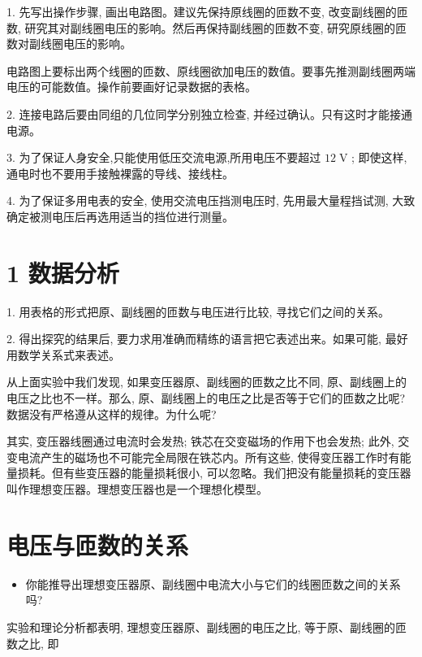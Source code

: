 \documentclass[10pt]{article}
\begin{document}
1. 先写出操作步骤, 画出电路图。建议先保持原线圈的匝数不变, 改变副线圈的匝数, 研究其对副线圈电压的影响。然后再保持副线圈的匝数不变, 研究原线圈的匝数对副线圈电压的影响。

电路图上要标出两个线圈的匝数、原线圈欲加电压的数值。要事先推测副线圈两端电压的可能数值。操作前要画好记录数据的表格。

2. 连接电路后要由同组的几位同学分别独立检查, 并经过确认。只有这时才能接通电源。

3. 为了保证人身安全,只能使用低压交流电源,所用电压不要超过 \({12}\mathrm{\;V}\) ; 即使这样, 通电时也不要用手接触裸露的导线、接线柱。

4. 为了保证多用电表的安全, 使用交流电压挡测电压时, 先用最大量程挡试测, 大致确定被测电压后再选用适当的挡位进行测量。

\section*{1 数据分析}

1. 用表格的形式把原、副线圈的匝数与电压进行比较, 寻找它们之间的关系。

2. 得出探究的结果后, 要力求用准确而精练的语言把它表述出来。如果可能, 最好用数学关系式来表述。

从上面实验中我们发现, 如果变压器原、副线圈的匝数之比不同, 原、副线圈上的电压之比也不一样。那么, 原、副线圈上的电压之比是否等于它们的匝数之比呢? 数据没有严格遵从这样的规律。为什么呢?

其实, 变压器线圈通过电流时会发热; 铁芯在交变磁场的作用下也会发热; 此外, 交变电流产生的磁场也不可能完全局限在铁芯内。所有这些, 使得变压器工作时有能量损耗。但有些变压器的能量损耗很小, 可以忽略。我们把没有能量损耗的变压器叫作理想变压器。理想变压器也是一个理想化模型。

\section*{电压与匝数的关系}

\begin{mdframed}

\begin{itemize}
\item 你能推导出理想变压器原、副线圈中电流大小与它们的线圈匝数之间的关系吗?
\end{itemize}

\end{mdframed}

实验和理论分析都表明, 理想变压器原、副线圈的电压之比, 等于原、副线圈的匝数之比, 即
\end{document}
